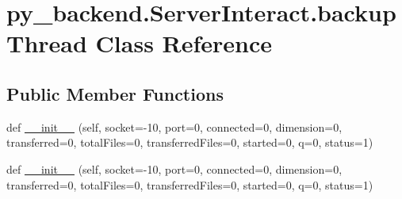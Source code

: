 \hypertarget{classpy__backend_1_1ServerInteract_1_1backupThread}{}\section{py\+\_\+backend.\+Server\+Interact.\+backup\+Thread Class Reference}
\label{classpy__backend_1_1ServerInteract_1_1backupThread}
\subsection*{Public Member Functions}
\begin{DoxyCompactItemize}
\item 
def \hyperlink{classpy__backend_1_1ServerInteract_1_1backupThread_ada5bb88d84390c37db4c7c34acdf8633}{\+\_\+\+\_\+init\+\_\+\+\_\+} (self, socket=-\/10, port=0, connected=0, dimension=0, transferred=0, total\+Files=0, transferred\+Files=0, started=0, q=0, status=1)
\item 
def \hyperlink{classpy__backend_1_1ServerInteract_1_1backupThread_ada5bb88d84390c37db4c7c34acdf8633}{\+\_\+\+\_\+init\+\_\+\+\_\+} (self, socket=-\/10, port=0, connected=0, dimension=0, transferred=0, total\+Files=0, transferred\+Files=0, started=0, q=0, status=1)
\end{DoxyCompactItemize}
